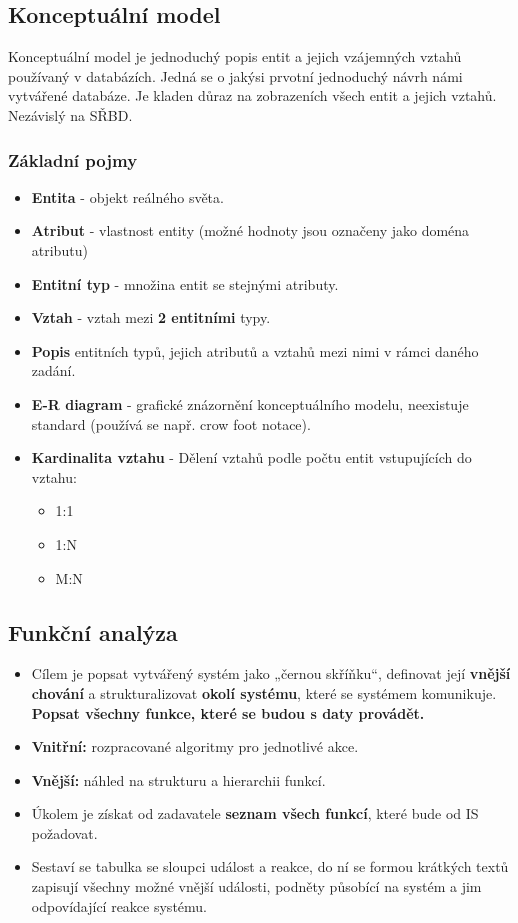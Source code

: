 \subsection*{Konceptuální model}
Konceptuální model je jednoduchý popis entit a jejich vzájemných vztahů používaný v databázích. Jedná se o jakýsi prvotní jednoduchý návrh námi vytvářené databáze. Je kladen důraz na zobrazeních všech entit a jejich vztahů. Nezávislý na SŘBD.

\subsubsection*{Základní pojmy}
\begin{itemize}
\item \textbf{Entita} - objekt reálného světa.
\item \textbf{Atribut} - vlastnost entity (možné hodnoty jsou označeny jako doména atributu)
\item \textbf{Entitní typ} - množina entit se stejnými atributy.
\item \textbf{Vztah} - vztah mezi \textbf{2 entitními} typy.
\item \textbf{Popis} entitních typů, jejich atributů a vztahů mezi nimi v rámci daného zadání.
\item \textbf{E-R diagram} - grafické znázornění konceptuálního modelu, neexistuje standard (používá se např. crow foot notace).
\item \textbf{Kardinalita vztahu} - Dělení vztahů podle počtu entit vstupujících do vztahu: 
\begin{itemize}
\item 1:1
\item 1:N
\item M:N
\end{itemize}
\end{itemize}

\subsection*{Funkční analýza}
\begin{itemize}
\item Cílem je popsat vytvářený systém jako „černou skříňku“, definovat její \textbf{vnější chování} a strukturalizovat \textbf{okolí systému}, které se systémem komunikuje. \textbf{Popsat všechny funkce, které se budou s daty provádět.}
\item \textbf{Vnitřní:} rozpracované algoritmy pro jednotlivé akce.
\item \textbf{Vnější:} náhled na strukturu a hierarchii funkcí.
\item Úkolem je získat od zadavatele\textbf{ seznam všech funkcí}, které bude od IS požadovat.
\item Sestaví se tabulka se sloupci událost a reakce, do ní se formou krátkých textů zapisují všechny možné vnější události, podněty působící na systém a jim odpovídající reakce systému. 
\end{itemize}

